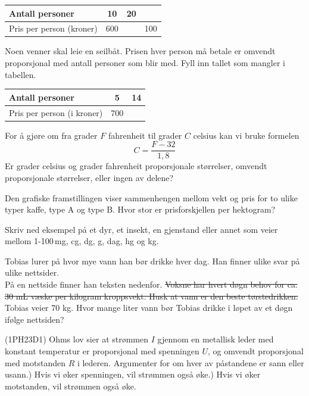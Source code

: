 \begin{center}
	\begin{tabular}{|l|c|c|c|}
		\hline
		Antall personer & 10 & 20 & \\
		\hline
		Pris per person (kroner) & 600 & & 100 \\
		\hline
	\end{tabular}
\end{center}

Noen venner skal leie en seilbåt. Prisen hver person må betale er omvendt proporsjonal med antall personer som blir med. Fyll inn tallet som mangler i tabellen.
\begin{center}
	\begin{tabular}{|l|c|c|}
		\hline
		Antall personer & 5 & 14 \\ \hline
		Pris per person (i kroner) & 700 & \\ \hline
	\end{tabular}
\end{center}



For å gjøre om fra grader $F$ fahrenheit til grader $C$ celsius kan vi bruke
formelen
\[ C=\frac{F-32}{1,8} \]
Er grader celsius og grader fahrenheit proporsjonale størrelser, omvendt
proporsjonale størrelser, eller ingen av delene?

Den grafiske framstillingen viser sammenhengen mellom vekt og pris for to
ulike typer kaffe, type A og type B.
Hvor stor er prisforskjellen per hektogram?


\newpage
\nes

Skriv ned eksempel på et dyr, et insekt, en gjenstand eller annet som veier mellom 1-100\,mg, cg, dg, g, dag, hg og kg.

Tobias lurer på hvor mye vann han bør drikke hver dag.\os
Han finner ulike svar på ulike nettsider.\\
På en nettside finner han teksten nedenfor.
\st{
Voksne har hvert døgn behov for ca. 30 mL væske per kilogram kroppsvekt.
Husk at vann er den beste tørstedrikken.
}
Tobias veier 70 kg. \os
Hvor mange liter vann bør Tobias drikke i løpet av et døgn ifølge nettsiden?


 (1PH23D1) \os
Ohms lov sier at strømmen $ I $ gjennom en metallisk leder med konstant temperatur
er proporsjonal med spenningen $ U $, og omvendt proporsjonal med motstanden $ R $ i lederen.\os
Argumenter for om hver av påstandene er sann eller usann.) Hvis vi øker spenningen, vil strømmen også øke.) Hvis vi øker motstanden, vil strømmen også øke.


